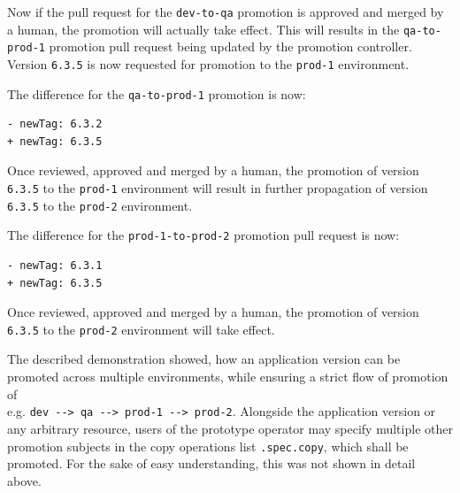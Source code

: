 Now if the pull request for the \lstinline|dev-to-qa| promotion
is approved and merged by a human,
the promotion will actually take effect.
This will results in the \lstinline|qa-to-prod-1| promotion pull request being updated
by the promotion controller.
Version \lstinline|6.3.5| is now requested for promotion to the
\lstinline|prod-1| environment.

The difference for the \lstinline|qa-to-prod-1| promotion is now:

\begin{lstlisting}
- newTag: 6.3.2
+ newTag: 6.3.5
\end{lstlisting}

Once reviewed, approved and merged by a human,
the promotion of version \lstinline|6.3.5| to the \lstinline|prod-1| environment
will result in further propagation of version \lstinline|6.3.5|
to the \lstinline|prod-2| environment.

The difference for the \lstinline|prod-1-to-prod-2| promotion pull request is now:

\begin{lstlisting}
- newTag: 6.3.1
+ newTag: 6.3.5
\end{lstlisting}

Once reviewed, approved and merged by a human,
the promotion of version \lstinline|6.3.5| to the \lstinline|prod-2| environment
will take effect.

The described demonstration showed,
how an application version can be promoted across multiple environments,
while ensuring a strict flow of promotion of \\
e.g. \lstinline|dev --> qa --> prod-1 --> prod-2|.
Alongside the application version or any arbitrary resource,
users of the prototype operator may specify multiple other
promotion subjects in the copy operations list \lstinline|.spec.copy|, which shall be promoted.
For the sake of easy understanding, this was not shown in detail above.



























